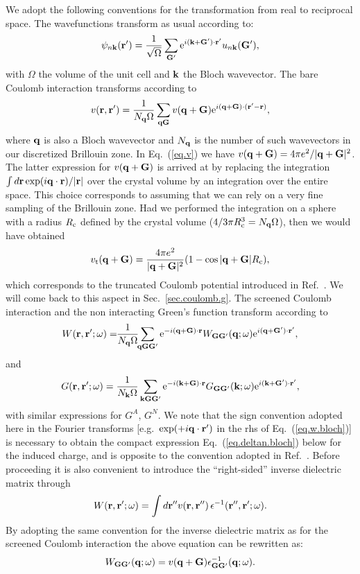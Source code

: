 \documentclass[twocolumn,prb,showpacs,superscriptaddress]{revtex4}
\def\w{\omega}
\def\q{{\bf q}}
\def\k{{\bf k}}
\def\G{{\bf G}}
\def\Gp{{\bf G^\prime}}
\def\r{{\bf r}}
\def\rp{{\bf r^\prime}}
\def\rpp{{\bf r^{\prime\prime}}}
\begin{document}
We adopt the following conventions for the transformation from real to reciprocal space.
The wavefunctions transform as usual according to:
  \begin{equation}
  \psi_{n\k}(\rp)=\frac{1}{\sqrt{\Omega}}\sum_\Gp
  {\rm e}^{i(\k+\Gp)\cdot\rp} u_{n\k}(\Gp),
  \end{equation}
with $\Omega$ the volume of the unit cell and $\k$ the Bloch wavevector.
The bare Coulomb interaction transforms according to
  \begin{equation}\label{eq.v}
  v(\r,\rp) = \frac{1}{N_\q\Omega}  \sum_{\q\G} v(\q+\G)
  {\rm e}^{i(\q+\G)\cdot(\rp-\r)},
  \end{equation}
where $\q$ is also a Bloch wavevector and $N_\q$ is the number of such wavevectors
in our discretized Brillouin zone. In Eq.\ (\ref{eq.v}) we have 
$v(\q+\G) = 4\pi e^2/|\q+\G|^2$.
The latter expression for $v(\q+\G)$ is arrived at by replacing
the integration $\int d\r \exp(i\q\cdot\r)/|\r|$ over the crystal volume by 
an integration over the entire space. This choice corresponds to assuming that 
we can rely on a very fine sampling of the Brillouin zone.
Had we performed the integration on a sphere
with a radius $R_{\rm c}$ defined by the crystal volume 
($4/3\pi R_{\rm c}^3 = N_\q \Omega$), then we would have obtained
  \begin{equation}
  v_{\rm t} (\q+\G) = \frac{4\pi e^2}{|\q+\G|^2} (1-\cos |\q+\G| R_{\rm c}),
  \end{equation}
which corresponds to the truncated Coulomb potential introduced in Ref.\ .
We will come back to this aspect in Sec.\ \ref{sec.coulomb.g}.
The screened Coulomb interaction and the non interacting Green's function
transform according to
  \begin{equation}\label{eq.w.bloch}
  W(\r,\rp;\w) = \!\!\frac{1}{N_\q\Omega} \!\! \sum_{\q\G\Gp} 
  {\rm e}^{-i(\q+\G)\cdot\r}
  W_{\G\Gp}(\q;\w)
  {\rm e}^{i(\q+\Gp)\cdot\rp},
  \end{equation}
and
  \begin{equation}
  G (\r,\rp;\w) = \frac{1}{N_\k\Omega}  \sum_{\k\G\Gp} 
   {\rm e}^{-i(\k+\G)\cdot\r} 
   G_{\G\Gp}(\k;\w)
   {\rm e}^{i(\k+\Gp)\cdot\rp},
  \end{equation}
with similar expressions for $G^A$, $G^N$.
We note that the sign convention adopted here in the Fourier transforms
[e.g.\ ${\rm exp}(+i\q\cdot\rp)$ in the rhs of Eq.\ (\ref{eq.w.bloch})]
is necessary to obtain the compact expression Eq.\ (\ref{eq.deltan.bloch}) below
for the induced charge, and is opposite to the convention adopted in Ref.~.
Before proceeding it is also convenient to introduce the ``right-sided'' inverse dielectric matrix
through
  \begin{equation}
  W(\r,\rp;\w) = \int d\rpp v(\r,\rpp) \, \epsilon^{-1}(\rpp,\rp;\w).
  \end{equation}
By adopting the same convention for the inverse dielectric matrix
as for the screened Coulomb interaction 
the above equation can be rewritten as:
  \begin{equation}\label{eq.Wg}
  W_{\G\Gp}(\q;\w) = v(\q+\G)  \epsilon^{-1}_{\G\Gp}(\q;\w).
  \end{equation}
\end{document}
